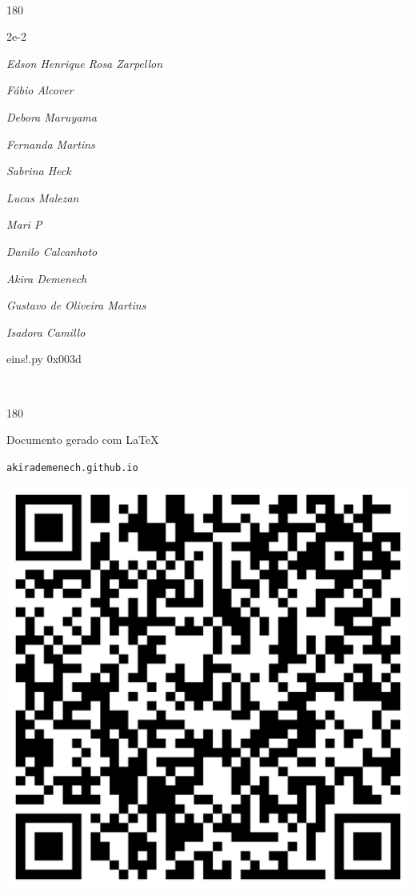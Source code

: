 \documentclass[12pt]{article}
\begin{document}
	\ 
	\vfill
	\begin{turn}{180}	
		\begin{minipage}{\textwidth}
		  	\ttfamily %
			\centering
			{\Huge 2e-2}
		  
			\hfill
		  
			

\textit{\small Edson Henrique Rosa Zarpellon}

\textit{\small Fábio Alcover}

\textit{\small Debora Maruyama}

\textit{\small Fernanda Martins}

\textit{\small Sabrina Heck}

\textit{\small Lucas Malezan}

\textit{\small Mari P}

\textit{\small Danilo Calcanhoto}

\textit{\small Akira Demenech}

\textit{\small Gustavo de Oliveira Martins}

\textit{\small Isadora Camillo}

\bigskip

eins!.py
0x003d


		\end{minipage}	
	\end{turn}
	\vfill
	\

\pagebreak

	\begin{turn}{180}	
		\begin{minipage}{\textwidth}		  
		  Documento gerado com \LaTeX			
		  
		  \texttt{akirademenech.github.io}

		  \includegraphics[height=0.3\textheight]{2e-2.pdf}

		\end{minipage}	
	\end{turn}  
		  
\end{document}
